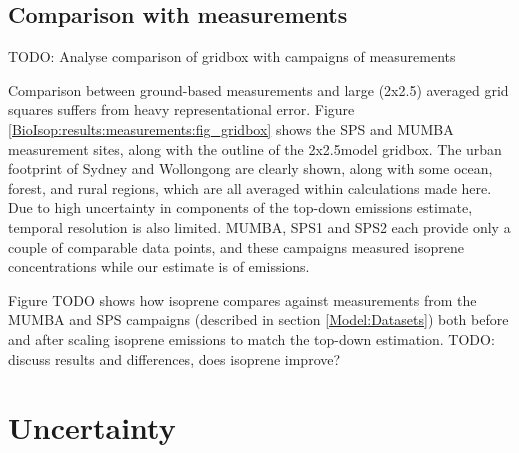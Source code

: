   
  \subsection{Comparison with measurements}
    
    TODO: %
    Analyse comparison of gridbox with campaigns of measurements
    
    Comparison between ground-based measurements and large (2x2.5\degr) averaged grid squares suffers from heavy representational error.
    Figure \ref{BioIsop:results:measurements:fig_gridbox} shows the SPS and MUMBA measurement sites, along with the outline of the 2x2.5\degr model gridbox. 
    The urban footprint of Sydney and Wollongong are clearly shown, along with some ocean, forest, and rural regions, which are all averaged within calculations made here.
    Due to high uncertainty in components of the top-down emissions estimate, temporal resolution is also limited.
    MUMBA, SPS1 and SPS2 each provide only a couple of comparable data points, and these campaigns measured isoprene concentrations while our estimate is of emissions.
    
    
    Figure TODO shows how isoprene compares against measurements from the MUMBA and SPS campaigns (described in section \ref{Model:Datasets}) both before and after scaling isoprene emissions to match the top-down estimation.
    TODO: discuss results and differences, does isoprene improve?
    

\section{Uncertainty}
\label{BioIsop:uncertainty}
  
